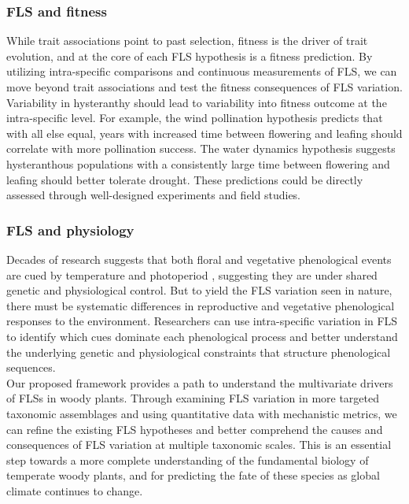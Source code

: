 \documentclass[12pt]{article}\usepackage[]{graphicx}\usepackage[]{color}
\begin{document}
\subsubsection*{FLS and fitness}
\indent\indent While trait associations point to past selection, fitness is the driver of trait evolution, and at the core of each FLS hypothesis is a fitness prediction. By utilizing intra-specific comparisons and continuous measurements of FLS, we can move beyond trait associations and test the fitness consequences of FLS variation. \\
\indent Variability in hysteranthy should lead to variability into fitness outcome at the intra-specific level. For example, the wind pollination hypothesis predicts that with all else equal, years with increased time between flowering and leafing should correlate with more pollination success. The water dynamics hypothesis suggests hysteranthous populations with a consistently large time between flowering and leafing should better tolerate drought. These predictions could be directly assessed through well-designed experiments and field studies.\\
\subsubsection*{FLS and physiology} 
\indent\indent Decades of research suggests that both floral and vegetative phenological events are cued by temperature and photoperiod \citep{Forrest2010, Flynn2018}, suggesting they are under shared genetic and physiological control. But to yield the FLS variation seen in nature, there must be systematic differences in reproductive and vegetative phenological responses to the environment. Researchers can use intra-specific variation in FLS to identify which cues dominate each phenological process and better understand the underlying genetic and physiological constraints that structure phenological sequences.\\

\indent Our proposed framework provides a path to understand the multivariate drivers of FLSs in woody plants. Through examining FLS variation in more targeted taxonomic assemblages and using quantitative data with mechanistic metrics, we can refine the existing FLS hypotheses and better comprehend the causes and consequences of FLS variation at multiple taxonomic scales. This is an essential step towards a more complete understanding of the fundamental biology of temperate woody plants, and for predicting the fate of these species as global climate continues to change.
\end{document}
